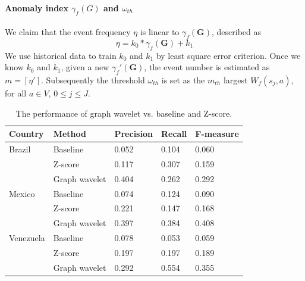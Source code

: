 \documentclass[twoside,leqno,twocolumn]{article}
\begin{document}
\paragraph{Anomaly index $\gamma_f(G)$ and $\omega_{th}$}
We claim that the event frequency $\eta$ is linear to $\gamma_f(\mathbf{G})$, described as
\begin{equation}
\label{eq:linear_equation}
\eta = k_0*\gamma_f(\mathbf{G}) + k_1
\end{equation}We use historical data to train $k_0$ and $k_1$ by least square error criterion. Once we know
$k_0$ and $k_1$, given a new $\gamma_f'(\mathbf{G})$, the event number is estimated as $m=\left \lceil \eta' \right \rceil$. Subsequently the
threshold $\omega_{th}$ is set as the $m_{th}$ largest $W_f(s_j,a)$, for all $a\in V$, $0\le j \le J$.


\begin{table}[bt] %
\renewcommand{\arraystretch}{1.1}
\caption{\label{table:models_compare} The performance of graph wavelet vs. baseline and Z-score.}
\scriptsize
\centering
\begin{tabular}{ l | l |l | l | l}
\hline
\textbf{Country} & \textbf{Method}& \textbf{Precision}  & \textbf{Recall}  & \textbf{F-measure} \\
\hline
Brazil & Baseline & 0.052 &0.104 & 0.060\\
       & Z-score & 0.117&0.307 & 0.159 \\
 & Graph wavelet& 0.404 &0.262 & 0.292 \\
\hline
Mexico & Baseline & 0.074 &0.124 & 0.090 \\
       & Z-score & 0.221 &0.147 & 0.168 \\
 & Graph wavelet& 0.397 &0.384 & 0.408 \\
\hline
Venezuela & Baseline & 0.078 &0.053 & 0.059 \\
       & Z-score & 0.197 &0.197 & 0.189 \\
 & Graph wavelet& 0.292 &0.554 & 0.355 \\
\hline
\end{tabular}
\end{table}
\end{document}

